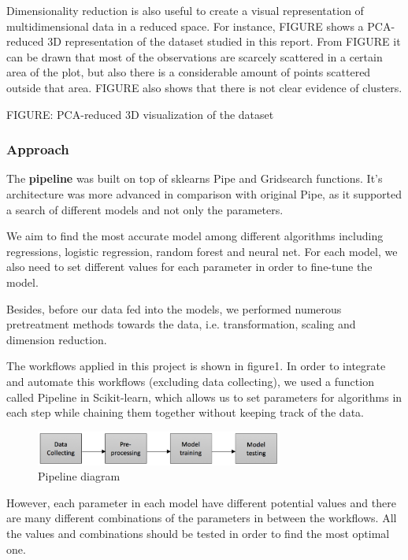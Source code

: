 Dimensionality reduction is also useful to create a visual representation of multidimensional data in a reduced space. For instance, FIGURE shows a PCA-reduced 3D representation of the dataset studied in this report. From FIGURE it can be drawn that most of the observations are scarcely scattered in a certain area of the plot, but also there is a considerable amount of points scattered outside that area. FIGURE also shows that there is not clear evidence of clusters. 

FIGURE: PCA-reduced 3D visualization of the dataset

\subsubsection{Approach}
The \textbf{pipeline} was built on top of sklearns Pipe and Gridsearch functions. It’s architecture was more advanced in comparison with original Pipe, as it supported a search of different models and not only the parameters.

We aim to find the most accurate model among different algorithms including regressions, logistic regression, random forest and neural net. For each model, we also need to set different values for each parameter in order to fine-tune the model.
 
Besides, before our data fed into the models, we performed numerous pretreatment methods towards the data, i.e. transformation, scaling and dimension reduction.
 
The workflows applied in this project is shown in figure1. In order to integrate and automate this workflows (excluding data collecting), we used a function called Pipeline in Scikit-learn, which allows us to set parameters for algorithms in each step while chaining them together without keeping track of the data.

\begin{figure}[h]
\centering
\includegraphics[width=3.2in]{figures/pipeline}
\caption{Pipeline diagram}
\label{fig:pipeline}
\end{figure}
 
However, each parameter in each model have different potential values and there are many different combinations of the parameters in between the workflows. All the values and combinations should be tested in order to find the most optimal one.
 
